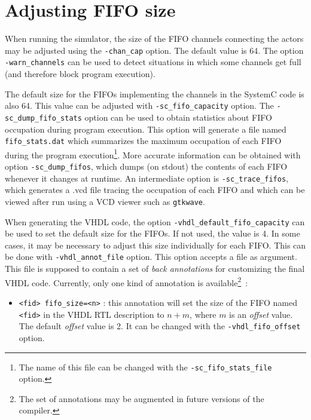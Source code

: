 \section{Adjusting FIFO size}
\label{sec:adjusting-fifo-size}

When running the simulator, the size of the FIFO channels connecting the actors may be adjusted using the
\verb|-chan_cap| option. The default value is 64. The option \verb|-warn_channels| can be used to
detect situations in which some channels get full (and therefore block program execution).

\medskip The default size for the FIFOs implementing the channels in the SystemC code is also
64. This value can be adjusted with \verb|-sc_fifo_capacity| option. The \verb|-sc_dump_fifo_stats|
option can be used to obtain statistics about FIFO occupation during program execution. This option
will generate a file named \verb|fifo_stats.dat| which summarizes the maximum occupation of each
FIFO during the program execution\footnote{The name of this file can be changed with the
  \texttt{-sc\_fifo\_stats\_file} option.}. More
accurate information can be obtained with option \verb|-sc_dump_fifos|, which dumps (on stdout) the
contents of each FIFO whenever it changes at runtime. An intermediate option is
\verb|-sc_trace_fifos|, which generates a .vcd file tracing the occupation of each FIFO and which
can be viewed after run using a VCD viewer such as \texttt{gtkwave}.

\medskip When generating the VHDL code, the option \verb|-vhdl_default_fifo_capacity| can be used to
set the default size for the FIFOs. If not used, the value is 4. In some cases, it may be necessary
to adjust this size individually for each FIFO. This can be done with \verb|-vhdl_annot_file|
option. This option accepts a file as argument. This file is supposed to contain a set of \emph{back
  annotations} for customizing the final VHDL code. Currently, only one kind of annotation is
available\footnote{The set of annotations may be augmented in future versions of the \caph
  compiler.}~:

\begin{itemize}
\item \verb|<fid> fifo_size=<n>| : this annotation will set the size of the FIFO named \verb|<fid>|
  in the VHDL RTL description to $n+m$, where $m$ is an \emph{offset} value. The default
  \emph{offset} value is 2. It can be changed with the \verb|-vhdl_fifo_offset| option. 
\end{itemize}

